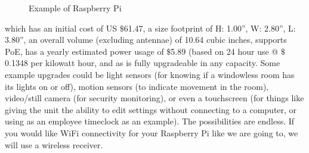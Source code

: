 \documentclass{report}
\begin{document}
\begin{figure}[H]
\caption{Example of Raspberry Pi}
\end{figure}
which has an initial cost of US $\$$61.47, a size footprint of H: 1.00”, W: 2.80”, L: 3.80”, an overall volume (excluding antennae) of 10.64 cubic inches, supports PoE, has a yearly estimated power usage of $\$$5.89 (based on 24 hour use @ $\$$0.1348 per kilowatt hour, and as is fully upgradeable in any capacity.
Some example upgrades could be light sensors (for knowing if a windowless room has its lights on or off), motion sensors (to indicate movement in the room), video/still camera (for security monitoring), or even a touchscreen (for things like giving the unit the ability to edit settings without connecting to a computer, or using as an employee timeclock as an example).
The possibilities are endless.
If you would like WiFi connectivity for your Raspberry Pi like we are going to, we will use a wireless receiver.
\newpage
\end{document}
